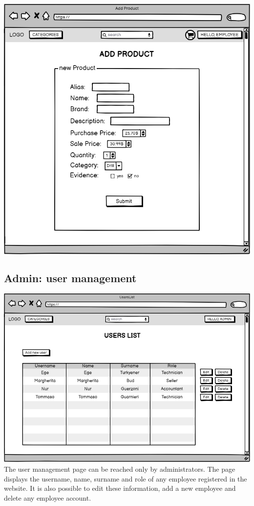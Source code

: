     
    \includegraphics[width=\textwidth,height=\textheight,keepaspectratio]{mockups/addProductPageMockup.png}
\\



\subsection{Admin: user management}
    \includegraphics[width=\textwidth,height=\textheight,keepaspectratio]{mockups/usersListPageMockup.png}
\\
    The user management page can be reached only by administrators. The page displays the username, name, surname and role of any employee registered in the website. It is also possible to edit these information, add a new employee and delete any employee account.


